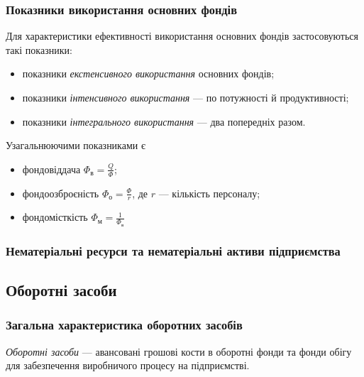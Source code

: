 \documentclass[a5paper,10pt,notitlepage,pdftex,headsepline]{scrartcl}
\begin{document}
    \subsubsection{Показники використання основних фондів}
      Для характеристики ефективності використання основних фондів
      застосовуються такі показники:
      \begin{itemize}
        \item показники \emph{екстенсивного використання} основних фондів;
        \item показники \emph{інтенсивного використання} --- по потужності й
          продуктивності;
        \item показники \emph{інтегрального використання} --- два попередніх
          разом.
      \end{itemize}

      Узагальнюючими показниками є
      \begin{itemize}
        \item фондовіддача $\displaystyle \Phi_\text{в} = \frac{Q}{\Phi}$;
        \item фондоозброєність $\displaystyle \Phi_\text{о} = \frac{\Phi}{r}$,
          де $r$ --- кількість персоналу;
        \item фондомісткість $\displaystyle \Phi_\text{м} =
          \frac{1}{\Phi_\text{в}}$
      \end{itemize}

    \subsubsection{Нематеріальні ресурси та нематеріальні активи підприємства}
  \subsection{Оборотні засоби}
    \subsubsection{Загальна характеристика оборотних засобів}
      \emph{Оборотні засоби} --- авансовані грошові кости в оборотні фонди та
      фонди обігу для забезпечення виробничого процесу на підприємстві.
\end{document}
